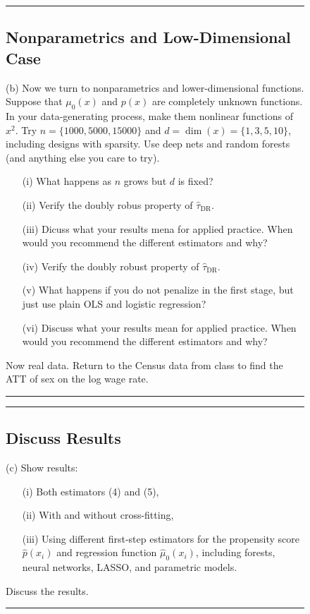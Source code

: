 \documentclass{article}
\newenvironment{colorparagraph}[1]{\par\color{#1}}{\par}
\begin{document}
\begin{figure}[H]
  \begin{colorparagraph}{questioncolor}
  \rule{\textwidth}{0.5pt}
  \label{q2b}
  \subsection{Nonparametrics and Low-Dimensional Case}

  (b) Now we turn to nonparametrics and lower-dimensional functions. Suppose that \( \mu_0(x) \) and \( p(x) \) are completely unknown functions. In your data-generating process, make them nonlinear functions of \( x^2 \). Try \( n = \{1000, 5000, 15000\} \) and \( d = \dim(x) = \{1, 3, 5, 10\} \), including designs with sparsity. Use deep nets and random forests (and anything else you care to try).

  \begin{itemize}
    \item[(i)] What happens as \( n \) grows but \( d \) is fixed?
    \item[(ii)] Verify the doubly robus property of $\hat{\tau}_{\text{DR}}$.
    \item[(iii)] Dicuss what your results mena for applied practice. When would you recommend the different estimators and why?
    \item[(iv)] Verify the doubly robust property of \( \hat{\tau}_{\text{DR}} \).
    \item[(v)] What happens if you do not penalize in the first stage, but just use plain OLS and logistic regression?
    \item[(vi)] Discuss what your results mean for applied practice. When would you recommend the different estimators and why?
\end{itemize}

  Now real data. Return to the Census data from class to find the ATT of sex on the log wage rate.
  \rule{\textwidth}{0.5pt}
  \end{colorparagraph}  
\end{figure}

\begin{figure}[H]
  \begin{colorparagraph}{questioncolor}
  \rule{\textwidth}{0.5pt}
  \label{q2c}
  \subsection{Discuss Results}
  (c) Show results:
  \begin{itemize}
      \item[(i)] Both estimators (4) and (5),
      \item[(ii)] With and without cross-fitting,
      \item[(iii)] Using different first-step estimators for the propensity score \( \hat{p}(x_i) \) and regression function \( \hat{\mu}_0(x_i) \), including forests, neural networks, LASSO, and parametric models.
  \end{itemize}

  Discuss the results.

  \rule{\textwidth}{0.5pt}
  \end{colorparagraph}
\end{figure}
\end{document}

